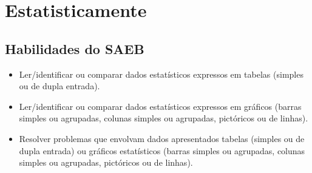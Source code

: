 \chapter{Estatisticamente}


\section{Habilidades do SAEB}

\begin{itemize}
\item Ler/identificar ou comparar dados estatísticos expressos em tabelas
(simples ou de dupla entrada).

\item Ler/identificar ou comparar dados estatísticos expressos em gráficos
(barras simples ou agrupadas, colunas simples ou agrupadas, pictóricos
ou de linhas).

\item Resolver problemas que envolvam dados apresentados tabelas (simples ou
de dupla entrada) ou gráficos estatísticos (barras simples ou agrupadas,
colunas simples ou agrupadas, pictóricos ou de linhas).
\end{itemize}


